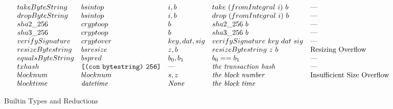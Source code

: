 \documentclass[../main.tex]{subfiles}
\begin{document}
\begin{figure*}[t]
\[\begin{array}{lllll}
        takeByteString    &   bsintop   &   i, b     & take ~ (fromIntegral ~ i) ~ b   &   \textrm{---} \\
        dropByteString    &   bsintop   &   i, b     & drop ~ (fromIntegral ~ i) ~ b   &   \textrm{---} \\
        
        sha2\_256         &  cryptoop  &   b           & sha2\_256 ~ b    & \textrm{---}                \\
        sha3\_256         &  cryptoop  &   b           & sha3\_256~ b     & \textrm{---}                \\
        
        verifySignature   &  cryptover  &   key, dat, sig           & verifySignature ~ key ~ dat ~ sig   &   \textrm{---}          \\
        
        resizeBytestring   &   bsresize   &   z, b   &   resizeBytestring ~ z ~ b   &   \textrm{Resizing Overflow} \\
        
        equalsByteString  &   bspred   &   b_0 , b_1   & b_0 == b_1   &   \textrm{---}  \\
        
        txhash   &   \texttt{[} \texttt{(} \texttt{con} ~ \texttt{bytestring} \texttt{)} ~ \texttt{256} \texttt{]}   &   \textrm{---}  & \textit{the transaction hash}   &   \textrm{---}  \\
        
        blocknum  &  blocknum  & s, z & \textit{the block number}   &   \textrm{Insufficient Size Overflow}  \\
        
        blocktime &  \mathit{datetime}  &  \textit{None}  & \textit{the block time}   &   \textrm{}  \\
    \end{array}\]
    
    \caption{Builtin Types and Reductions}
    \label{fig:Plutus_core_builtins}
\end{figure*}

\normalsize
\end{document}
